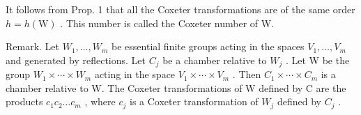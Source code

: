It follows from Prop. 1 that all the Coxeter transformations are of the same order \(h = h(\mathrm{W})\) . This number is called the Coxeter number of W.

Remark. Let \(W_{1},\ldots,W_{m}\) be essential finite groups acting in the spaces \(V_{1},\ldots,V_{m}\) and generated by reflections. Let \(C_{j}\) be a chamber relative to \(W_{j}\) . Let W be the group \(W_{1}\times\cdots\times W_{m}\) acting in the space \(V_{1}\times\cdots\times V_{m}\) . Then \(C_{1}\times\cdots\times C_{m}\) is a chamber relative to W. The Coxeter transformations of W defined by C are the products \(c_{1}c_{2}\ldots c_{m}\) , where \(c_{j}\) is a Coxeter transformation of \(W_{j}\) defined by \(C_{j}\) .

